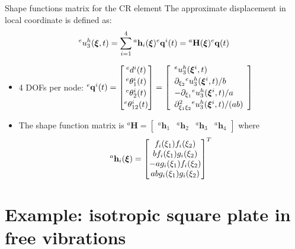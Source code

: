 \documentclass[aspectratio=169]{beamer}
\begin{document}
{
\color{white}
\begin{frame}{Shape functions matrix for the CR element}
  The approximate displacement in local coordinate is defined as:
  $$  {}^eu_3^h(\boldsymbol\xi,t) =\sum_{i=1}^4  {}^a\mathbf h_i(\boldsymbol\xi) {}^e\mathbf  q^i(t)= {}^a\mathbf{H}(\boldsymbol\xi){}^e\mathbf{q}(t)$$
  \begin{itemize}
    \item  4 DOFs per node: ${}^e\mathbf  q^i(t)=\begin{bmatrix}
              {}^ed^i(t) \\[2pt] {}^e{\theta}^i_1(t) \\[2pt] {}^e{\theta}^i_2(t) \\[2pt] {}^e{\theta}^i_{12}(t)
            \end{bmatrix}=\left[\begin{array}{lll}
                {}^eu_3^h(\boldsymbol\xi^i,t) \\[2pt] \partial_{\xi_2}{}^eu_3^h(\boldsymbol\xi^i,t)/b \\[2pt] -\partial_{\xi_1}{}^eu_3^h(\boldsymbol\xi^i,t)/a \\[2pt] \partial^2_{\xi_1\xi_2}{}^eu_3^h(\boldsymbol\xi^i,t)/(ab)
              \end{array}\right]$ \vspace{0.3cm}
    \item The shape function matrix is ${}^a\mathbf H=\begin{bmatrix}
              {}^a \mathbf h_1 & {}^a\mathbf  h_2 & {}^a \mathbf h_3 & {}^a\mathbf  h_4
            \end{bmatrix}$ where
          $$ {}^a\mathbf  h_i(\boldsymbol\xi) =\begin{bmatrix}
              f_i(\xi_1)f_i(\xi_2)     \\
              bf_i(\xi_1)g_i(\xi_2 )   \\
              -a g_i(\xi_1)f_i(\xi_2 ) \\
              ab g_i(\xi_1)g_i(\xi_2 )
            \end{bmatrix}^T$$
  \end{itemize}
\end{frame}
}

\section{Example: isotropic square plate in free vibrations}
\end{document}
